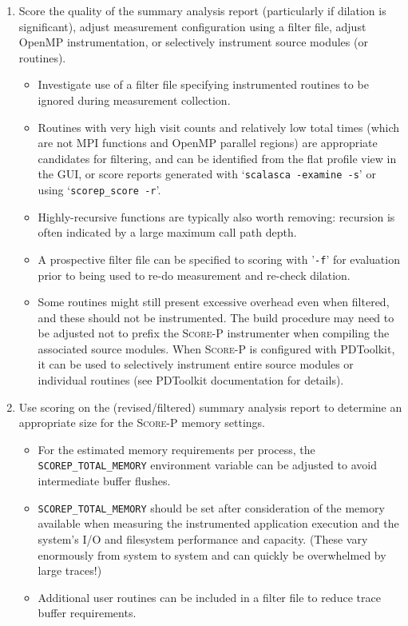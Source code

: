 \documentclass[a4paper]{article}
\newcommand{\Scorep}{\textsc{Score-P}\xspace}
\begin{document}
\begin{enumerate}
\item Score the quality of the summary analysis report (particularly if
dilation is significant),  adjust measurement configuration using a
filter file, adjust OpenMP instrumentation, or selectively instrument
source modules (or routines).

\begin{itemize}
\item Investigate use of a filter file specifying instrumented routines
to be ignored during measurement collection.
\item Routines with very high visit counts and relatively low total
times (which are not MPI functions and OpenMP parallel regions)
are appropriate candidates for filtering, and can be identified from the
flat profile view in the GUI, or score reports generated with
`\verb+scalasca -examine -s+' or using `\verb+scorep_score -r+'.
\item Highly-recursive functions are typically also worth removing:
recursion is often indicated by a large maximum call path depth.
\item A prospective filter file can be specified to scoring with '\verb+-f+'
for evaluation prior to being used to re-do measurement and re-check dilation.
\item Some routines might still present excessive overhead even when
filtered, and these should not be instrumented.  The build
procedure may need to be adjusted not to prefix the \Scorep
instrumenter when compiling the associated source modules.
When \Scorep is configured with PDToolkit, it can be used to selectively instrument
entire source modules or individual routines (see PDToolkit documentation for details).
\end{itemize}

\item Use scoring on the (revised/filtered) summary analysis report
to determine an appropriate size for the \Scorep memory settings.

\begin{itemize}
\item For the estimated memory requirements per process, the \verb+SCOREP_TOTAL_MEMORY+
environment variable can be adjusted to avoid intermediate buffer flushes.
\item \verb+SCOREP_TOTAL_MEMORY+ should be set after consideration of the
memory available when measuring the instrumented application execution
and the system's I/O and filesystem performance and capacity.  (These
vary enormously from system to system and can quickly be overwhelmed by
large traces!)
\item Additional user routines can be included in a filter file to
reduce trace buffer requirements.
\end{itemize}


\end{enumerate}
\end{document}
